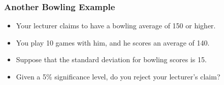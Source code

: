 \documentclass[14pt]{beamer}
\begin{document}
\begin{frame}
	\frametitle{Another Bowling Example}
	
	\begin{itemize}[label={\color{blue}$\blacktriangleright$}]
		\item Your lecturer claims to have a bowling average of 150 or higher.
		
		\item You play 10 games with him, and he scores an average of 140.
		
		\item Suppose that the standard deviation for bowling scores is 15.
		
		\item Given a 5\% significance level, do you reject your lecturer's claim?
	\end{itemize}
	
\end{frame}
\end{document}
